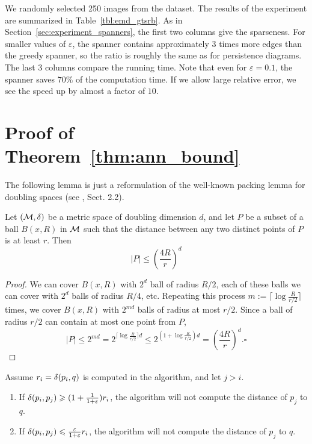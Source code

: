 \documentclass{ws-ijcga}
\renewcommand{\leq}{\leqslant}
\renewcommand{\geq}{\geqslant}
\newcommand{\eps}{\varepsilon}
\begin{document}
We randomly selected 250 images from the dataset.
The results of the experiment are summarized in Table~\ref{tbl:emd_gtsrb}.
As in Section~\ref{sec:experiment_spanners}, 
the first two columns give the sparseness.
For smaller values of $\eps$,
the \bgrdy spanner contains approximately 3 times more
edges than the greedy spanner, so the ratio is roughly
the same as for persistence diagrams.
The last 3 columns compare the running time.
Note that even for $\eps=0.1$,
the \bgrdy spanner saves $70\%$ of the computation time.
If we allow large relative error,
we see the speed up by almost a factor of $10$.



\section{Proof of Theorem~\ref{thm:ann_bound}}
\label{sec:proof_ann}

The following lemma is just a reformulation of the well-known
packing lemma for doubling spaces (see \cite{smid_2009}, Sect. 2.2).

\begin{lemma}
\label{lem:packing_lemma}
 Let $(\mathcal{M},\delta)$ be a metric space of doubling dimension $d$, and let $P$ be a subset of a ball 
 $B(x,R)$ in $\mathcal{M}$ such that the distance between any two distinct points of $P$ is at least $r$.
 Then 
 \[|P|\leq \left(\frac{4R}{r}\right)^{d}\]

\end{lemma}
\begin{proof}
We can cover $B(x,R)$ with $2^d$ ball of radius $R/2$, each of these balls we can cover with $2^d$
balls of radius $R/4$, etc. Repeating this process $m := \lceil \log \frac{R}{r/2} \rceil$ times, 
we cover
$B(x, R)$ with $2^{md}$ balls of radius at most $r/2$. Since a ball of radius $r/2$ can
contain at most one point from $P$, 
\[|P|\leq 2^{md}= 2^{\lceil \log \frac{R}{r/2} \rceil d}\leq 2^{(1 + \log \frac{R}{r/2})d}=\left(\frac{4R}{r}\right)^{d}.\square\]
\end{proof}


\begin{lemma}
\label{lem:bound_lemma}
Assume $r_i=\delta(p_i,q)$ is computed in the algorithm, and let $j>i$.
\begin{enumerate}
\item If $\dist(p_i,p_j)\geq (1+\frac{1}{1+\eps}) r_i$, the algorithm will not compute the distance
of $p_j$ to $q$.
\item If $\dist(p_i,p_j)\leq\frac{\eps}{1+\eps}r_i$, the algorithm will not compute
the distance of $p_j$ to $q$.
\end{enumerate}
\end{lemma}
\end{document}

